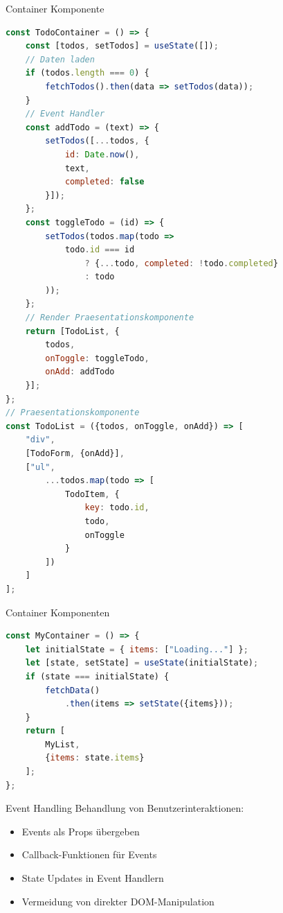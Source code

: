 \begin{KR}{Container Komponente}
\begin{lstlisting}[language=JavaScript, style=basesmol]
const TodoContainer = () => {
    const [todos, setTodos] = useState([]);
    // Daten laden
    if (todos.length === 0) {
        fetchTodos().then(data => setTodos(data));
    }
    // Event Handler
    const addTodo = (text) => {
        setTodos([...todos, {
            id: Date.now(),
            text,
            completed: false
        }]);
    };
    const toggleTodo = (id) => {
        setTodos(todos.map(todo =>
            todo.id === id
                ? {...todo, completed: !todo.completed}
                : todo
        ));
    };
    // Render Praesentationskomponente
    return [TodoList, {
        todos,
        onToggle: toggleTodo,
        onAdd: addTodo
    }];
};
// Praesentationskomponente
const TodoList = ({todos, onToggle, onAdd}) => [
    "div",
    [TodoForm, {onAdd}],
    ["ul",
        ...todos.map(todo => [
            TodoItem, {
                key: todo.id,
                todo,
                onToggle
            }
        ])
    ]
];
\end{lstlisting}
\end{KR}

\begin{KR}{Container Komponenten}
\begin{lstlisting}[language=JavaScript, style=basesmol]
const MyContainer = () => {
    let initialState = { items: ["Loading..."] };
    let [state, setState] = useState(initialState);
    if (state === initialState) {
        fetchData()
            .then(items => setState({items}));
    }
    return [
        MyList, 
        {items: state.items}
    ];
};
\end{lstlisting}
\end{KR}

\begin{concept}{Event Handling}
    Behandlung von Benutzerinteraktionen:
    \begin{itemize}
        \item Events als Props übergeben
        \item Callback-Funktionen für Events
        \item State Updates in Event Handlern
        \item Vermeidung von direkter DOM-Manipulation
    \end{itemize}
\end{concept}

